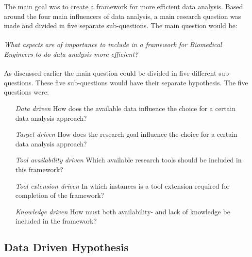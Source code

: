\documentclass[10pt,a4paper]{article}
\begin{document}
	The main goal was to create a framework for more efficient data analysis. Based around the four main influencers of data analysis, a main research question was made and divided in five separate sub-questions. The main question would be:\\
	\\
	\emph{What aspects are of importance to include in a framework for Biomedical Engineers to do data analysis more efficient?}\\
	\\
	As discussed earlier the main question could be divided in five different sub-questions. These five sub-questions would have their separate hypothesis. The five questions were:
	
	\begin{enumerate}

	\item[\textit{Data driven}] How does the available data influence the choice for a certain data analysis approach?
	
	\item[\textit{Target driven}] How does the research goal influence the choice for a certain data analysis approach?
	
	\item[\textit{Tool availability driven}] Which available research tools should be included in this framework?
	
	\item[\textit{Tool extension driven}] In which instances is a tool extension required for completion of the framework?
	
	\item[\textit{Knowledge driven}] How must both availability- and lack of knowledge be included in the framework?
	
	\end{enumerate}
	
	\subsection{Data Driven Hypothesis}
	\label{subsec:DataDrivenHypothesis}
	
\end{document}
